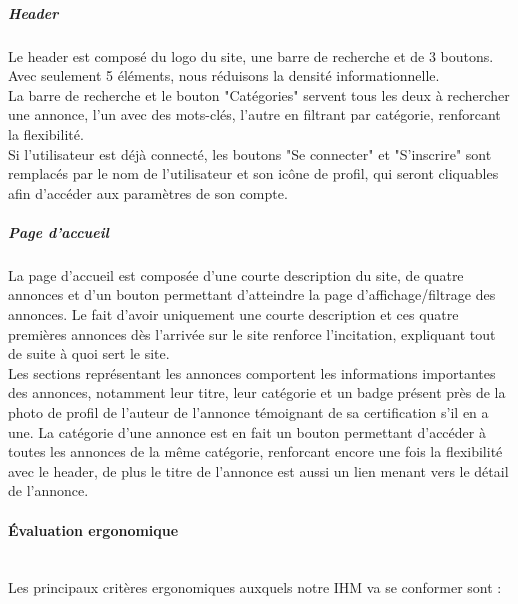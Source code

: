 \documentclass[a4paper,11pt]{article}
\begin{document}
\subparagraph{Header}

Le header est composé du logo du site, une barre de recherche et de 3 boutons.
Avec seulement 5 éléments, nous réduisons la densité informationnelle.\\
La barre de recherche et le bouton "Catégories" servent tous les deux à rechercher une
annonce, l'un avec des mots-clés, l'autre en filtrant par catégorie, renforcant
la flexibilité.\\


Si l'utilisateur est déjà connecté, les boutons "Se connecter" et "S'inscrire"
sont remplacés par le nom de l'utilisateur et son icône de profil, qui seront
cliquables afin d'accéder aux paramètres de son compte.\\

\subparagraph{Page d'accueil}

La page d'accueil est composée d'une courte description du site, de quatre annonces et
d'un bouton permettant d'atteindre la page d'affichage/filtrage des annonces.
Le fait d'avoir uniquement une courte description et ces quatre premières annonces
dès l'arrivée sur le site renforce l'incitation, expliquant tout de suite à quoi sert
le site.\\

Les sections représentant les annonces comportent les informations importantes des
annonces, notamment leur titre, leur catégorie et un badge présent près de la photo de profil
de l'auteur de l'annonce témoignant de sa certification s'il en a une. La catégorie d'une annonce
est en fait un bouton permettant d'accéder à toutes les annonces de la même catégorie,
renforcant encore une fois la flexibilité avec le header, de plus le titre de l'annonce
est aussi un lien menant vers le détail de l'annonce.\\

\paragraph{Évaluation ergonomique}\mbox{} \\

Les principaux critères ergonomiques auxquels notre IHM va se conformer sont :\\
\end{document}
